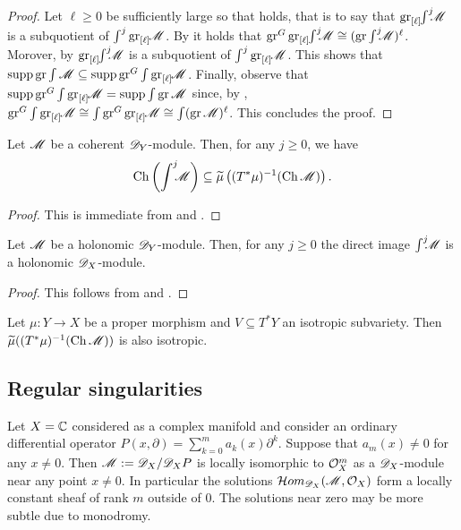 \begin{proof}
  Let $\ell\geq 0$ be sufficiently large so that  holds, that is to say that $\operatorname{gr}_{[\ell]}\mkern-5mu\int^j \mkern -8mu \mathscr{M}$ is a subquotient of $\int^j \operatorname{gr}_{[\ell]}\mkern-5mu \mathscr{M}$.
  By  it holds that $\operatorname{gr}^G\operatorname{gr}_{[\ell]}\mkern-5mu \int^j \mkern -8mu \mathscr{M} \cong (\operatorname{gr}\int^j \mkern -8mu\mathscr{M})^\ell$.
  Morover, by  $\operatorname{gr}_{[\ell]}\mkern-5mu \int^j \mkern -8mu \mathscr{M}$ is a subquotient of $\int^{j} \operatorname{gr}_{[\ell]}\mkern-5mu\mathscr{M}$.
  This shows that $\operatorname{supp}\operatorname{gr}\int\mathscr{M} \subseteq \operatorname{supp} \operatorname{gr}^G\int\operatorname{gr}_{[\ell]}\mkern-5mu \mathscr{M}$.
  Finally, observe that $\operatorname{supp} \operatorname{gr}^G\int\operatorname{gr}_{[\ell]}\mkern-5mu \mathscr{M} = \operatorname{supp} \int \operatorname{gr} \mathscr{M}$ since, by , $\operatorname{gr}^G\int\operatorname{gr}_{[\ell]}\mkern-5mu \mathscr{M} \cong \int\operatorname{gr}^G\operatorname{gr}_{[\ell]}\mkern-5mu\mathscr{M}\cong \int (\operatorname{gr}\mathscr{M})^\ell$.
  This concludes the proof.
\end{proof}
\begin{theorem}\label{thm: KashiwaraEstimate}
    Let $\mathscr{M}$ be a coherent $\mathscr{D}_Y$-module. Then, for any $j\geq 0$, we have
    $$\operatorname{Ch}\left(\int^j \mkern -8mu \mathscr{M} \right)\subseteq  \widetilde{\mu}\left((T^*\mu)^{-1}(\operatorname{Ch} \mathscr{M}) \right).$$
\end{theorem}
\begin{proof}
  This is immediate from  and .
\end{proof}
\begin{corollary}\label{cor: RelHolConserved}
  Let $\mathscr{M}$ be a holonomic $\mathscr{D}_Y$-module.
  Then, for any $j\geq 0$ the direct image $\int^j \mkern -8mu\mathscr{M}$ is a holonomic $\mathscr{D}_X$-module.
\end{corollary}
\begin{proof}
  This follows from  and .
\end{proof}
\begin{lemma}{\cite[Proposition 4.9.]{kashiwara1976b}}\label{lem: IsotropicDirectImage}
  Let $\mu:Y\to X$ be a proper morphism and $V\subseteq T^*Y$ an isotropic subvariety. Then $\widetilde{\mu}((T^*\mu)^{-1}(\operatorname{Ch} \mathscr{M}) )$ is also isotropic.
\end{lemma}
\subsection{Regular singularities}
Let $X=\mathbb{C}$ considered as a complex manifold and consider an ordinary differential operator
$P(x,\partial) = \sum_{k=0}^m a_k(x)\partial^k.$
Suppose that $a_m(x)\neq 0$ for any $x\neq 0$.
Then $\mathscr{M} :=\mathscr{D}_X/\mathscr{D}_X P$ is locally isomorphic to $\mathcal{O}_X^m$ as a $\mathscr{D}_X$-module near any point $x\neq 0$.
In particular the solutions $\mathcal{H}om_{\mathscr{D}_X}(\mathscr{M},\mathcal{O}_X)$ form a locally constant sheaf of rank $m$ outside of $0$.
The solutions near zero may be more subtle due to monodromy.


